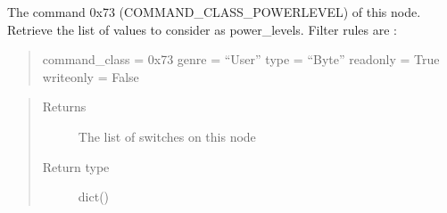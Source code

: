 \documentclass[letterpaper,10pt,english]{sphinxmanual}
\begin{document}
\begin{fulllineitems}
\begin{fulllineitems}
\begin{quote}
\begin{description}
\end{description}\end{quote}

\end{fulllineitems}


\begin{fulllineitems}
\label{command:openzwave.command.ZWaveNodeBasic.get_power_levels}
The command 0x73 (COMMAND\_CLASS\_POWERLEVEL) of this node.
Retrieve the list of values to consider as power\_levels.
Filter rules are :
\begin{quote}

command\_class = 0x73
genre = ``User''
type = ``Byte''
readonly = True
writeonly = False
\end{quote}
\begin{quote}\begin{description}
\item[{Returns}] \leavevmode
The list of switches on this node

\item[{Return type}] \leavevmode
dict()

\end{description}\end{quote}

\end{fulllineitems}


\end{fulllineitems}

\end{document}
